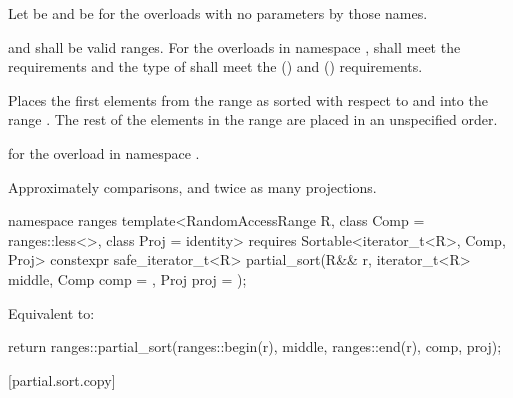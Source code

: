 \begin{itemdescr}
\pnum
Let  be 
and  be 
for the overloads with no parameters by those names.

\pnum
\requires
{} and  shall be valid ranges.
For the overloads in namespace ,
 shall meet
the  requirements and
the type of  shall meet
the  () and
 () requirements.

\pnum
\effects
Places the first  elements
from the range 
as sorted with respect to  and 
into the range .
The rest of the elements in the range 
are placed in an unspecified order.
%

\pnum
\returns
{} for the overload in namespace .

\pnum
\complexity
Approximately  comparisons, and
twice as many projections.
\end{itemdescr}

\begin{itemdecl}
namespace ranges {
  template<RandomAccessRange R, class Comp = ranges::less<>, class Proj = identity>
    requires Sortable<iterator_t<R>, Comp, Proj>
    constexpr safe_iterator_t<R>
      partial_sort(R&& r, iterator_t<R> middle, Comp comp = {}, Proj proj = {});
}
\end{itemdecl}

\begin{itemdescr}
\pnum
\effects
Equivalent to:
\begin{codeblock}
return ranges::partial_sort(ranges::begin(r), middle, ranges::end(r), comp, proj);
\end{codeblock}
\end{itemdescr}

[partial.sort.copy]{}

